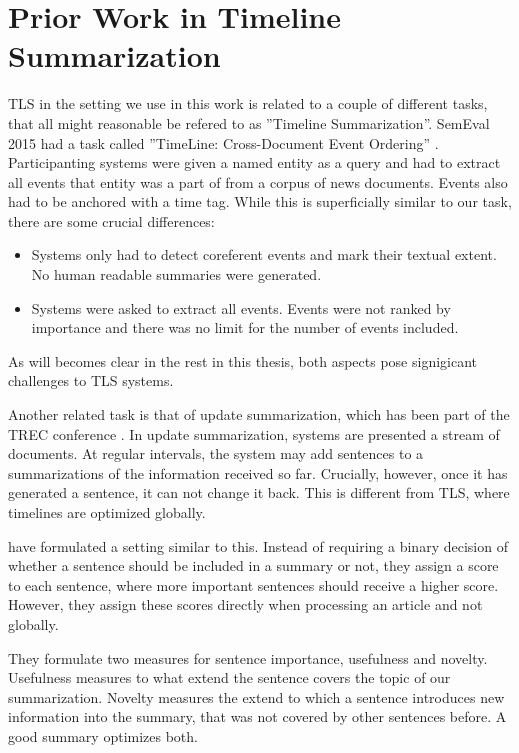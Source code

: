 \documentclass[a4paper,BCOR=10mm]{report}
\numberwithin{lemma}{chapter}
\numberwithin{definition}{chapter}
\begin{document}
\section{Prior Work in Timeline Summarization}


TLS in the setting we use in this work is related to a couple of different tasks, that all might reasonable be refered to as ''Timeline Summarization''.
SemEval 2015 had a task called ''TimeLine: Cross-Document Event Ordering'' \citep{semeval-timeline}. Participanting systems were given a named entity as a query and had to extract all events that entity was a part of from a corpus of news documents. Events also had to be anchored with a time tag.
While this is superficially similar to our task, there are some crucial differences:

\begin{itemize}
    \item{Systems only had to detect coreferent events and mark their textual extent. No human readable summaries were generated. }
    \item{Systems were asked to extract all events. Events were not ranked by importance and there was no limit for the number of events included. }
\end{itemize}

As will becomes clear in the rest in this thesis, both aspects pose signigicant challenges to TLS systems.

Another related task is that of update summarization, which has been part of the TREC conference \citep{trec-update}.
In update summarization, systems are presented a stream of documents.
At regular intervals, the system may add sentences to a summarizations of the information received so far.
Crucially, however, once it has generated a sentence, it can not change it back.
This is different from TLS, where timelines are optimized globally.

\citet{swan+allen-temporal-summaries} have formulated a setting similar to this. Instead of requiring a binary decision of whether a sentence should be included in a summary or not, they assign a score to each sentence, where more important sentences should receive a higher score. However, they assign these scores directly when processing an article and not globally.

They formulate two measures for sentence importance, usefulness and novelty.
Usefulness measures to what extend the sentence covers the topic of our summarization. Novelty measures the extend to which a sentence introduces new information into the summary, that was not covered by other sentences before.
A good summary optimizes both.
\end{document}
